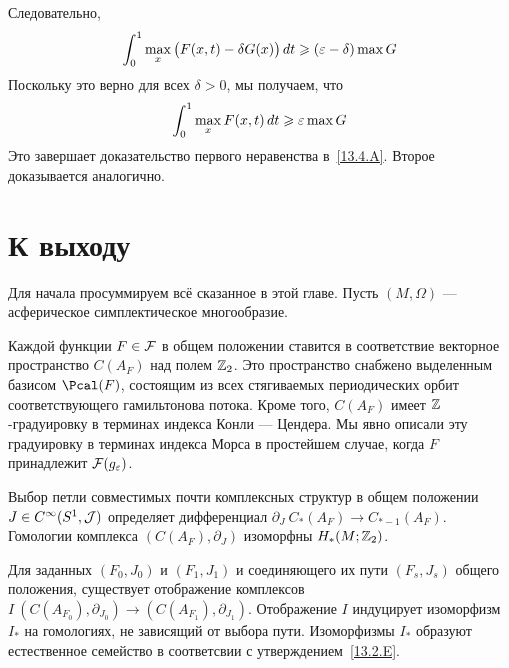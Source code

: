 Следовательно,
\[
\int_{0}^{1}\max_{x}\big(F(x,t)-\delta G(x)\big)\,d t
\geqslant
(\varepsilon-\delta)\max G
\]
Поскольку это верно для всех  $\delta > 0$, мы получаем, что
\[
\int_{0}^{1}\max_{x} F(x,t)\,d t
\geqslant
\varepsilon\max G
\]
Это завершает доказательство первого неравенства в~\ref{13.4.A}.
Второе доказывается аналогично.
\qeds

\section{К выходу}\label{13.5}

Для начала просуммируем всё сказанное в этой главе.
Пусть $(M,\Omega)$ — асферическое симплектическое многообразие.

\let\subsectionsave=\subsection
\makeatletter
\renewcommand{\subsection}{%
  \@startsection{subsection}%
  {2}%
  {0pt}%
  {1ex}%
  {0pt}%
  {\it}}
\makeatother
\def\thesubsection{\thesection.\Alph{subsection}}

\begin{ex}{}\label{13.5.A}
Каждой функции $F\in\mathcal{F}$ в общем положении ставится в соответствие
векторное пространство $C(A_{F})$ над полем $\mathbb{Z}_{2}$.
Это пространство снабжено выделенным базисом $\Pcal(F)$, состоящим из
всех стягиваемых периодических орбит соответствующего гамильтонова
потока. 
Кроме того, $C(A_{F})$ имеет $\mathbb{Z}$-градуировку в терминах индекса
Конли — Цендера. 
Мы явно описали эту градуировку в терминах индекса Морса в простейшем
случае, когда $F$ принадлежит $\mathcal{F}(g_{\varepsilon})$.
\end{ex}

\begin{ex}{}\label{13.5.B}
Выбор петли совместимых почти комплексных структур в общем положении
$J\in C^{\infty}(S^{1}, \mathcal{J})$ определяет дифференциал
$\partial_{J}\:C_{*}(A_{F})\to C_{*-1}(A_{F})$.
Гомологии комплекса $(C(A_{F}),\partial_{J})$ изоморфны
$H_{*}(M;\mathbb{Z}_{2})$. 
\end{ex}

\begin{ex}{}\label{13.5.C}
Для заданных $(F_{0},J_{0})$ и $(F_{1},J_{1})$ и соединяющего их пути
$(F_{s},J_{s})$ общего положения, существует  отображение
комплексов $I\:(C(A_{F_{0}}),\partial_{J_{0}})\to(C(A_{F_{1}}),\partial_{J_{1}})$.
Отображение $I$ индуцирует изоморфизм $I_{*}$ на гомологиях, не
зависящий от выбора пути. 
Изоморфизмы $I_{*}$ образуют естественное
семейство в соответсвии с 
утверждением~\ref{13.2.E}. 
\end{ex}

